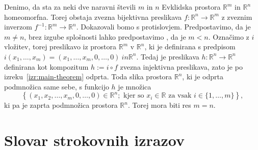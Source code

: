 \documentclass[mat1]{fmfdelo}
\newcommand{\literatura}{literatura}  %
\newcommand{\R}{\mathbb R}
\newcommand{\0}{\underline{0}}
\begin{document}
\begin{dokaz}
Denimo, da sta za neki dve naravni števili $m$ in $n$ Evklidska prostora $\R^m$ in $\R^n$ homeomorfna. Torej obstaja zvezna bijektivna preslikava $f : \R^n \to \R^m$ z zveznim inverzom $f^{-1} : \R^m \to \R^n$. Dokazovali bomo s protislovjem. Predpostavimo, da je $m \neq n$, brez izgube splošnosti lahko predpostavimo , da je $m < n$. Označimo z $i$ vložitev, torej preslikavo iz prostora $\R^m$ v $\R^n$, ki je definirana s predpisom $i(x_1, \dots, x_m) = (x_1, \dots, x_m, 0, \dots, 0) \ in \R^n$. Tedaj je preslikava $h : \R^n \to \R^n$ definirana kot kompozitum $h := i \circ f$ zvezna injektivna preslikava, zato je po izreku~\ref{izr:main-theorem} odprta. Toda slika prostora $\R^n$, ki je odprta podmnožica same sebe, s funkcijo $h$ je množica 
$$\left \{ (x_1, x_2, \dots, x_m, 0, \dots, 0) \in \R^n ; \text{ kjer so } x_i \in \R \text{ za vsak } i \in \{1, \dots, m \}  \right \},$$
 ki pa je zaprta podmnožica prostora $\R^n$. Torej mora biti res $m = n$.
\end{dokaz}

\section*{Slovar strokovnih izrazov}



\geslo{}{}

        
\end{document}
